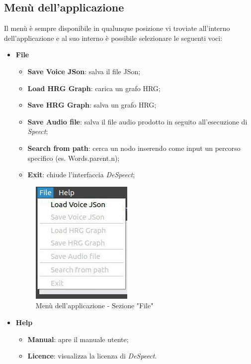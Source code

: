 \documentclass[openany,12pt,a4paper]{report}
\begin{document}
	\subsection{Menù dell'applicazione}
	Il menù è sempre disponibile in qualunque posizione vi troviate all'interno dell'applicazione e al suo interno è possibile selezionare le seguenti voci:
	\begin{itemize}
		\item \textbf{File} 
			\begin{itemize}
				\item \textbf{Save Voice JSon}: salva il file JSon;
				\item \textbf{Load HRG Graph}: carica un grafo HRG;
				\item \textbf{Save HRG Graph}: salva un grafo HRG;
				\item \textbf{Save Audio file}: salva il file audio prodotto in seguito all'esecuzione di \textit{Speect};
				\item \textbf{Search from path}: cerca un nodo inserendo come input un percorso specifico (es. Words.parent.n);
				\item \textbf{Exit}: chiude l'interfaccia \textit{DeSpeect};
			\end{itemize}
		
		\begin{figure}[H]
			
			\centering
			
				\includegraphics[width=.4\textwidth]{./img/menu_file}
			
			\caption{Menù dell'applicazione - Sezione "File"}
			
		\end{figure}
		\item \textbf{Help}
			\begin{itemize}
				\item \textbf{Manual}: apre il manuale utente;
				\item \textbf{Licence}: visualizza la licenza di \textit{DeSpeect}.
			\end{itemize}
	\begin{figure}[H]
		

\end{figure}
\end{itemize}
\end{document}
